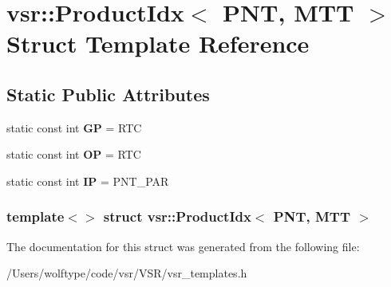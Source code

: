 \hypertarget{structvsr_1_1_product_idx_3_01_p_n_t_00_01_m_t_t_01_4}{\section{vsr\-:\-:Product\-Idx$<$ P\-N\-T, M\-T\-T $>$ Struct Template Reference}
\label{structvsr_1_1_product_idx_3_01_p_n_t_00_01_m_t_t_01_4}
}
\subsection*{Static Public Attributes}
\begin{DoxyCompactItemize}
\item 
\hypertarget{structvsr_1_1_product_idx_3_01_p_n_t_00_01_m_t_t_01_4_aba78037faa729a40bfde2e8c96641da2}{static const int {\bfseries G\-P} = R\-T\-C}\label{structvsr_1_1_product_idx_3_01_p_n_t_00_01_m_t_t_01_4_aba78037faa729a40bfde2e8c96641da2}

\item 
\hypertarget{structvsr_1_1_product_idx_3_01_p_n_t_00_01_m_t_t_01_4_af0f23ac583f92e093da986114d0fca90}{static const int {\bfseries O\-P} = R\-T\-C}\label{structvsr_1_1_product_idx_3_01_p_n_t_00_01_m_t_t_01_4_af0f23ac583f92e093da986114d0fca90}

\item 
\hypertarget{structvsr_1_1_product_idx_3_01_p_n_t_00_01_m_t_t_01_4_a9cd368844519204849b452e468283235}{static const int {\bfseries I\-P} = P\-N\-T\-\_\-\-P\-A\-R}\label{structvsr_1_1_product_idx_3_01_p_n_t_00_01_m_t_t_01_4_a9cd368844519204849b452e468283235}

\end{DoxyCompactItemize}
\subsubsection*{template$<$$>$ struct vsr\-::\-Product\-Idx$<$ P\-N\-T, M\-T\-T $>$}



The documentation for this struct was generated from the following file\-:\begin{DoxyCompactItemize}
\item 
/\-Users/wolftype/code/vsr/\-V\-S\-R/vsr\-\_\-templates.\-h\end{DoxyCompactItemize}

